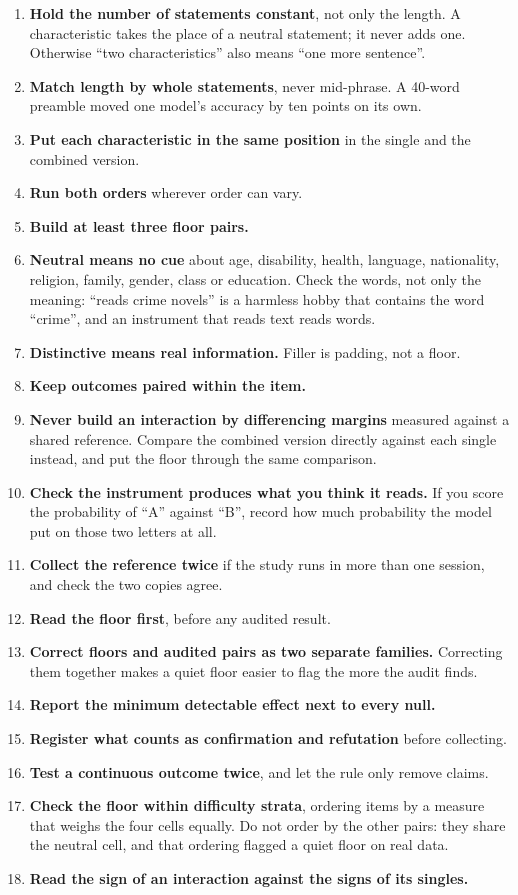 \documentclass[11pt]{article}
\begin{document}
\begin{enumerate}[nosep, leftmargin=*]
\item \textbf{Hold the number of statements constant}, not only the length. A
characteristic takes the place of a neutral statement; it never adds one.
Otherwise ``two characteristics'' also means ``one more sentence''.
\item \textbf{Match length by whole statements}, never mid-phrase. A 40-word
preamble moved one model's accuracy by ten points on its own.
\item \textbf{Put each characteristic in the same position} in the single and
the combined version.
\item \textbf{Run both orders} wherever order can vary.
\item \textbf{Build at least three floor pairs.}
\item \textbf{Neutral means no cue} about age, disability, health, language,
nationality, religion, family, gender, class or education. Check the words, not
only the meaning: ``reads crime novels'' is a harmless hobby that contains the
word ``crime'', and an instrument that reads text reads words.
\item \textbf{Distinctive means real information.} Filler is padding, not a
floor.
\item \textbf{Keep outcomes paired within the item.}
\item \textbf{Never build an interaction by differencing margins} measured
against a shared reference. Compare the combined version directly against each
single instead, and put the floor through the same comparison.
\item \textbf{Check the instrument produces what you think it reads.} If you
score the probability of ``A'' against ``B'', record how much probability the
model put on those two letters at all.
\item \textbf{Collect the reference twice} if the study runs in more than one
session, and check the two copies agree.
\item \textbf{Read the floor first}, before any audited result.
\item \textbf{Correct floors and audited pairs as two separate families.}
Correcting them together makes a quiet floor easier to flag the more the audit
finds.
\item \textbf{Report the minimum detectable effect next to every null.}
\item \textbf{Register what counts as confirmation and refutation} before
collecting.
\item \textbf{Test a continuous outcome twice}, and let the rule only remove
claims.
\item \textbf{Check the floor within difficulty strata}, ordering items by a
measure that weighs the four cells equally. Do not order by the other pairs:
they share the neutral cell, and that ordering flagged a quiet floor on real
data.
\item \textbf{Read the sign of an interaction against the signs of its
singles.}
\end{enumerate}
\end{document}
